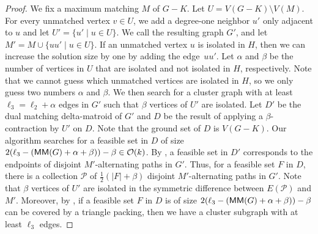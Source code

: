 \begin{proof}
  We fix a maximum matching $M$ of $G - K$.
  Let $U = V(G - K) \setminus V(M)$.
  For every unmatched vertex $v \in U$, we add a degree-one neighbor $u'$ only adjacent to $u$ and let $U' = \{ u' \mid u \in U \}$.
  We call the resulting graph $G'$, and let $M' = M \cup \{ uu' \mid u \in U \}$.
  If an unmatched vertex $u$ is isolated in $H$, then we can increase the solution size by one by adding the edge~$uu'$.
  Let $\alpha$ and $\beta$ be the number of vertices in $U$ that are isolated and not isolated in $H$, respectively. 
  Note that we cannot guess which unmatched vertices are isolated in $H$, so we only guess two numbers $\alpha$ and $\beta$.
  We then search for a cluster graph with at least $\ell_3 = \ell_2 + \alpha$ edges in $G'$ such that $\beta$ vertices of $U'$ are isolated.
  Let $D'$ be the dual matching delta-matroid of $G'$ and $D$ be the result of applying a $\beta$-contraction by $U'$ on $D$.
  Note that the ground set of $D$ is $V(G - K)$.
  Our algorithm searches for a feasible set in $D$ of size $2(\ell_3 - (\mathsf{MM}(G) + \alpha + \beta)) - \beta \in \mathcal{O}(k)$.
  By , a feasible set in $D'$ corresponds to the endpoints of disjoint $M'$-alternating paths in $G'$.
  Thus, for a feasible set $F$ in $D$, there is a collection $\mathcal{P}$ of $\frac{1}{2}(|F| + \beta)$ disjoint $M'$-alternating paths in $G'$.
  Note that $\beta$ vertices of $U'$ are isolated in the symmetric difference between $E(\mathcal{P})$ and $M'$.
  Moreover, by , if a feasible set $F$ in $D$ is of size $2(\ell_3 - (\mathsf{MM}(G) + \alpha + \beta)) - \beta$ can be covered by a triangle packing, then we have a cluster subgraph with at least $\ell_3$ edges.
\end{proof}


